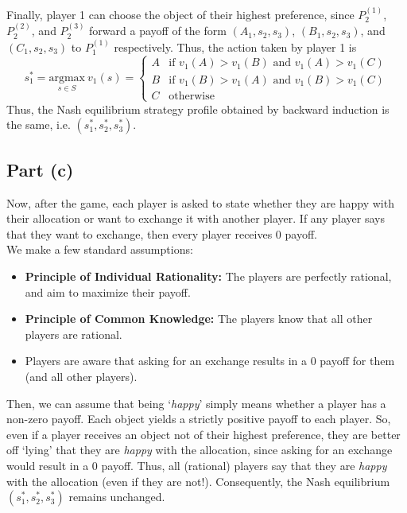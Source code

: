 \documentclass[9pt]{article}
\begin{document}
Finally, player 1 can choose the object of their highest preference, since $P_{2}^{(1)}$, $P_{2}^{(2)}$, and $P_{2}^{(3)}$ forward a payoff of the form $(A_{1}, s_{2}, s_{3})$, $(B_{1}, s_{2}, s_{3})$, and $(C_{1}, s_{2}, s_{3})$ to $P_{1}^{(1)}$ respectively.
Thus, the action taken by player 1 is
\begin{equation}
    s_{1}^{*} = \underset{s \in S}{\text{argmax}} \ v_{1}(s)
    = \begin{cases}
        A & \text{if } v_{1}(A) > v_{1}(B) \text{ and } v_{1}(A) > v_{1}(C) \\
        B & \text{if } v_{1}(B) > v_{1}(A) \text{ and } v_{1}(B) > v_{1}(C) \\
        C & \text{otherwise}
    \end{cases}
\end{equation}
Thus, the Nash equilibrium strategy profile obtained by backward induction is the same, i.e. $(s_{1}^{*}, s_{2}^{*}, s_{3}^{*})$.

\subsection*{Part (c)}
Now, after the game, each player is asked to state whether they are happy with their allocation or want to exchange it with another player.
If any player says that they want to exchange, then every player receives 0 payoff. \\
We make a few standard assumptions:
\begin{itemize}
    \item \textbf{Principle of Individual Rationality:} The players are perfectly rational, and aim to maximize their payoff.
    \item \textbf{Principle of Common Knowledge:} The players know that all other players are rational.
    \item Players are aware that asking for an exchange results in a 0 payoff for them (and all other players).
\end{itemize}
Then, we can assume that being `\textit{happy}' simply means whether a player has a non-zero payoff.
Each object yields a strictly positive payoff to each player.
So, even if a player receives an object not of their highest preference, they are better off `lying' that they are \textit{happy} with the allocation, since asking for an exchange would result in a 0 payoff.
Thus, all (rational) players say that they are \textit{happy} with the allocation (even if they are not!).
Consequently, the Nash equilibrium $(s_{1}^{*}, s_{2}^{*}, s_{3}^{*})$ remains unchanged. \\
\end{document}
